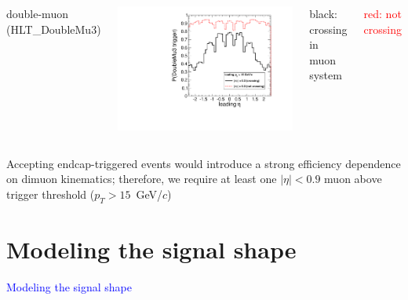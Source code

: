\documentclass[compress]{beamer}
\begin{document}
\begin{frame}
\begin{columns}
\centering double-muon (HLT\_DoubleMu3)

\includegraphics[width=\linewidth]{eta_mass5cut_triggerDoubleMu3.pdf}

\scriptsize \centering black: crossing in muon system

\vspace{0.2 cm}
\textcolor{red}{red: not crossing}
\end{columns}

\vspace{0.5 cm}
Accepting endcap-triggered events would introduce a strong efficiency
dependence on dimuon kinematics; therefore, we require at least one
$|\eta| < 0.9$ muon above trigger threshold ($p_T > 15$~GeV/$c$)
\end{frame}

\section*{Modeling the signal shape}
\begin{frame}
\begin{center}
\Huge \textcolor{blue}{Modeling the signal shape}
\end{center}
\end{frame}
\end{document}
